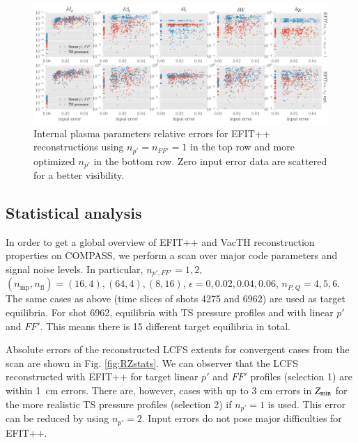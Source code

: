 \begin{figure}[!htb]
\centering   %
\hfill{}
\includegraphics[width=18cm]{figures/kinetic_stats_opt.pdf}
\hfill{}
\caption{Internal plasma parameters relative errors for EFIT++ reconstructions using $n_{p'}=n_{FF'}=1$ in the top row and more optimized $n_{p'}$ in the bottom row. Zero input error data are scattered for a better visibility.}
\label{fig:kinetic_stats}
\end{figure}


\subsection{Statistical analysis} %
\label{sub:statistical_analysis}

In order to get a global overview of EFIT++ and VacTH reconstruction properties on COMPASS, we perform a scan over major code parameters and signal noise levels. In particular, $n_{p',FF'} = 1,2 $, $(n_\mathrm{mp}, n_\mathrm{fl}) = (16, 4), (64, 4), (8, 16)$, $\epsilon = 0, 0.02, 0.04, 0.06$, $n_{P,Q} = 4, 5, 6$. The same cases as above (time slices of shots 4275 and 6962) are used as target equilibria. For shot 6962, equilibria with TS pressure profiles and with linear $p'$ and $FF'$. This means there is 15 different target equilibria in total.

Absolute errors of the reconstructed LCFS extents for convergent cases from the scan are shown in Fig. \ref{fig:RZstats}. We can observer that the LCFS reconstructed with EFIT++ for target linear $p'$ and $FF'$ profiles (selection 1) are within 1~cm errors. There are, however, cases with up to 3 cm errors in $Z_{\rm{min}}$ for the more realistic TS pressure profiles (selection 2) if $n_{p'}=1$ is used. This error can be reduced by using $n_{p'}=2$. Input errors do not pose major difficulties for EFIT++. 

